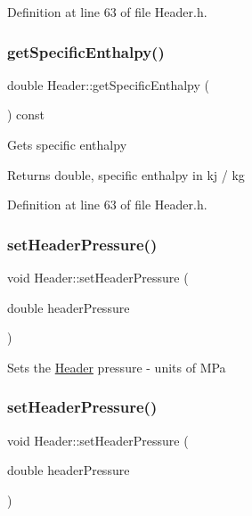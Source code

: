 Definition at line 63 of file Header.\+h.

\mbox{\label{class_header_af913dbf132f8cb3af6e6b374813acd93}} 
\subsubsection{\texorpdfstring{get\+Specific\+Enthalpy()}{getSpecificEnthalpy()}\hspace{0.1cm}{\footnotesize\ttfamily [3/3]}}
{\footnotesize\ttfamily double Header\+::get\+Specific\+Enthalpy (\begin{DoxyParamCaption}{ }\end{DoxyParamCaption}) const\hspace{0.3cm}{\ttfamily [inline]}}

Gets specific enthalpy \begin{DoxyReturn}{Returns}
double, specific enthalpy in kj / kg 
\end{DoxyReturn}


Definition at line 63 of file Header.\+h.

\mbox{\label{class_header_a3af0b7964b74287ce0c662b9a88556ed}} 
\subsubsection{\texorpdfstring{set\+Header\+Pressure()}{setHeaderPressure()}\hspace{0.1cm}{\footnotesize\ttfamily [1/3]}}
{\footnotesize\ttfamily void Header\+::set\+Header\+Pressure (\begin{DoxyParamCaption}\item[{double}]{header\+Pressure }\end{DoxyParamCaption})}

Sets the \hyperlink{class_header}{Header} pressure -\/ units of M\+Pa \mbox{\label{class_header_a3af0b7964b74287ce0c662b9a88556ed}} 
\subsubsection{\texorpdfstring{set\+Header\+Pressure()}{setHeaderPressure()}\hspace{0.1cm}{\footnotesize\ttfamily [2/3]}}
{\footnotesize\ttfamily void Header\+::set\+Header\+Pressure (\begin{DoxyParamCaption}\item[{double}]{header\+Pressure }\end{DoxyParamCaption})}


